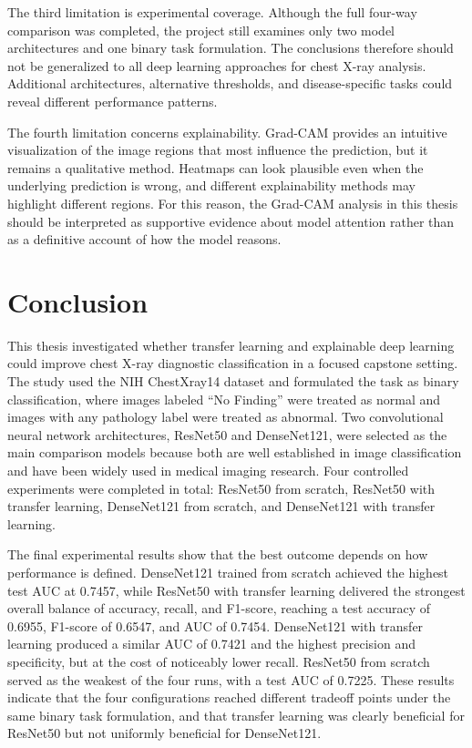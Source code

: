 The third limitation is experimental coverage. Although the full four-way comparison was completed, the project still examines only two model architectures and one binary task formulation. The conclusions therefore should not be generalized to all deep learning approaches for chest X-ray analysis. Additional architectures, alternative thresholds, and disease-specific tasks could reveal different performance patterns.

The fourth limitation concerns explainability. Grad-CAM provides an intuitive visualization of the image regions that most influence the prediction, but it remains a qualitative method. Heatmaps can look plausible even when the underlying prediction is wrong, and different explainability methods may highlight different regions. For this reason, the Grad-CAM analysis in this thesis should be interpreted as supportive evidence about model attention rather than as a definitive account of how the model reasons.

\section{Conclusion}
This thesis investigated whether transfer learning and explainable deep learning could improve chest X-ray diagnostic classification in a focused capstone setting. The study used the NIH ChestXray14 dataset and formulated the task as binary classification, where images labeled ``No Finding'' were treated as normal and images with any pathology label were treated as abnormal. Two convolutional neural network architectures, ResNet50 and DenseNet121, were selected as the main comparison models because both are well established in image classification and have been widely used in medical imaging research. Four controlled experiments were completed in total: ResNet50 from scratch, ResNet50 with transfer learning, DenseNet121 from scratch, and DenseNet121 with transfer learning.

The final experimental results show that the best outcome depends on how performance is defined. DenseNet121 trained from scratch achieved the highest test AUC at 0.7457, while ResNet50 with transfer learning delivered the strongest overall balance of accuracy, recall, and F1-score, reaching a test accuracy of 0.6955, F1-score of 0.6547, and AUC of 0.7454. DenseNet121 with transfer learning produced a similar AUC of 0.7421 and the highest precision and specificity, but at the cost of noticeably lower recall. ResNet50 from scratch served as the weakest of the four runs, with a test AUC of 0.7225. These results indicate that the four configurations reached different tradeoff points under the same binary task formulation, and that transfer learning was clearly beneficial for ResNet50 but not uniformly beneficial for DenseNet121.

